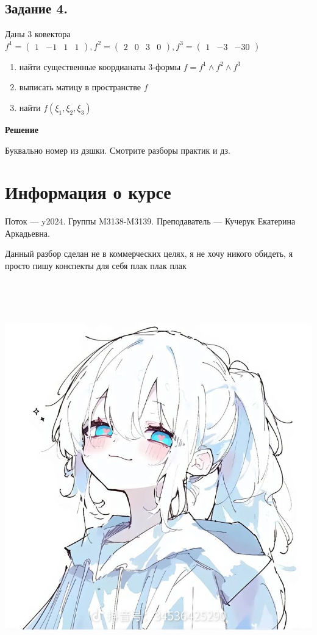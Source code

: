 \documentclass{article}
\begin{document}
\subsection{Задание 4.}

Даны 3 ковектора $f^1 = \begin{pmatrix}
    1 & -1 & 1 &1
\end{pmatrix}, f^2 = \begin{pmatrix}
    2 & 0 & 3 & 0 
\end{pmatrix}, f^3 = \begin{pmatrix}
    1 & -3 & -3 0
\end{pmatrix}$
\begin{enumerate}
    \item найти существенные коордианаты 3-формы $f =f^1 \wedge f^2 \wedge f^3$
    \item выписать матицу в пространстве $f$
    \item найти $f(\xi_1,\xi_2,\xi_3)$
\end{enumerate}
\textbf{Решение}

Буквально номер из дзшки. Смотрите разборы практик и дз.


\newpage
\section{Информация о курсе}

Поток — y2024.\newline
Группы M3138-M3139.\newline
Преподаватель --- Кучерук Екатерина Аркадьевна.\par

Данный разбор сделан не в коммерческих целях, я не хочу никого обидеть, я просто пишу конспекты для себя плак плак плак
\begin{center}
   \includegraphics[height=17cm]{assets/cute-girl.jpg}
\end{center}
\end{document}
